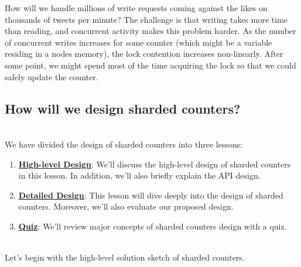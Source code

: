 How will we handle millions of write requests coming against the likes on thousands of tweets per minute? The challenge is that writing takes more time than reading, and concurrent activity makes this problem harder. As the number of concurrent writes increases for some counter (which might be a variable residing in a node\textquotesingle s memory), the lock contention increases non-linearly. After some point, we might spend most of the time acquiring the lock so that we could safely update the counter.\\

\subsection{How will we design sharded counters?}\label{N-EkheN-U1odqVLEweXY6}
\\
We have divided the design of sharded counters into three lessons:

\begin{enumerate}
\item
\protect{}\label{FxgYIV72obpF0-nXG4q_8}
\href{https://www.educative.io/courses/grokking-the-system-design-interview/high-level-design-of-sharded-counters}{\textbf{High-level Design}}: We'll discuss the high-level design of sharded counters in this lesson. In addition, we'll also briefly explain the API design.
\item
\protect{}\label{-Wm6XUbkoh6i7PKPBFbpo}
\href{https://www.educative.io/courses/grokking-the-system-design-interview/detailed-design-of-sharded-counters}{\textbf{Detailed Design}}: This lesson will dive deeply into the design of sharded counters. Moreover, we'll also evaluate our proposed design.
\item
\protect{}\label{woU9fW54ixB_O86f5Sl6g}
\href{https://www.educative.io/courses/grokking-the-system-design-interview/quiz-on-the-sharded-counters-design}{\textbf{Quiz}}: We'll review major concepts of sharded counters design with a quiz.
\end{enumerate}
\\
Let's begin with the high-level solution sketch of sharded counters.

